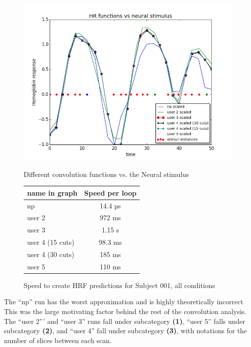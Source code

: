 \begin{figure}[ht]
\centering
	\begin{minipage}[b]{0.45\linewidth}
		\centering
		\includegraphics[width=.8\linewidth]{images/convolution_vs_neural_stimulus}  
		\caption{\scriptsize{Different convolution functions vs. the Neural stimulus}}
		\label{fig:convolution}

	\end{minipage}
\quad
	\begin{minipage}[b]{0.45\linewidth}
		\centering
		\begin{tabular}{|l | c|}
		\hline
		name in graph & Speed per loop \\
		\hline
		np    			 & 14.4 µs \\
		user 2     		 & 972 ms  \\
		user 3     		 & 1.15 s  \\
		user 4 (15 cuts) & 98.3 ms \\
		user 4 (30 cuts) & 185 ms  \\
		user 5     	 	 & 110 ms  \\
		\hline
		\end{tabular}
		\vspace{5mm}
		\caption{\scriptsize{Speed to create HRF predictions for Subject 001, all conditions}}
		\label{table:convolution}
	\end{minipage}
\end{figure}

The ``np'' run has the worst approximation and is highly theoretically incorrect 
This was the large motivating factor behind the rest of the convolution analysis. 
The ``user 2''' and ``user 3'' runs fall under subcategory \textbf{(1)}, 
``user 5'' falls under subcategory \textbf{(2)}, and ``user 4'' fall under 
subcategory \textbf{(3)}, with notations for the number of slices between each 
scan.

